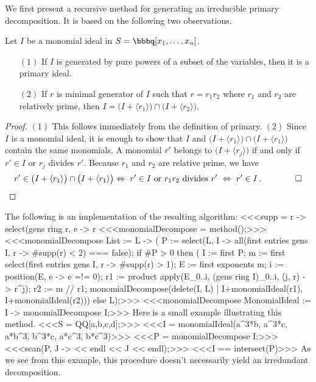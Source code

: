 We first present a recursive method for generating an irreducible
primary decomposition.  It is based on the following two observations.
\begin{lemma}
Let $I$ be a monomial ideal in $S = \bbbq[x_1, \dotsc, x_n]$.
\begin{enumerate}
\item[$(1)$] If $I$ is generated by pure powers of a subset of the
variables, then it is a primary ideal.
\item[$(2)$] If $r$ is minimal generator of $I$ such that $r =
r_{1}r_{2}$ where $r_{1}$ and $r_{2}$ are relatively prime, then $I =
\big(I + \langle r_{1} \rangle \big) \cap \big(I + \langle r_{2}
\rangle \big)$.
\end{enumerate}
\end{lemma}

\begin{proof}
$(1)$ This follows immediately from the definition of primary.  $(2)$
Since $I$ is a monomial ideal, it is enough to show that $I$ and
$\big( I + \langle r_{1} \rangle \big) \cap \big( I + \langle r_{1}
\rangle \big)$ contain the same monomials.  A monomial $r'$ belongs to
$\big( I + \langle r_{j} \rangle \big)$ if and only if $r' \in I$ or
$r_{j}$ divides $r'$.  Because $r_{1}$ and $r_{2}$ are relative prime,
we have
\[
r' \in \big( I + \langle r_{1} \rangle \big) \cap \big( I + \langle
r_{1} \rangle \big) \Leftrightarrow \text{ $r' \in I$ or $r_{1}r_{2}$
divides $r'$ } \Leftrightarrow \text{ $r' \in I$} \, . \qquad \qed
\]
\end{proof}

The following is an implementation of the resulting algorithm:
<<<supp = r -> select(gens ring r, e -> r %
<<<monomialDecompose = method();>>>
<<<monomialDecompose List := L -> (
     P := select(L, I -> all(first entries gens I, 
               r -> #supp(r) < 2) === false);
     if #P > 0 then (
          I := first P;
          m := first select(first entries gens I, 
               r -> #supp(r) > 1);
          E := first exponents m;
          i := position(E, e -> e =!= 0);
          r1 := product apply(E_{0..i}, (gens ring I)_{0..i}, 
               (j, r) -> r^j);
          r2 := m // r1;
          monomialDecompose(delete(I, L) | {I+monomialIdeal(r1),
                    I+monomialIdeal(r2)}))
     else L);>>>
<<<monomialDecompose MonomialIdeal := I -> monomialDecompose {I};>>>
Here is a small example illustrating this method.
<<<S = QQ[a,b,c,d];>>>
<<<I = monomialIdeal(a^3*b, a^3*c, a*b^3, b^3*c, a*c^3, b*c^3)>>>
<<<P = monomialDecompose I;>>>
<<<scan(P, J -> << endl << J << endl);>>>
<<<I == intersect(P)>>>
As we see from this example, this procedure doesn't necessarily
yield an irredundant decomposition.

